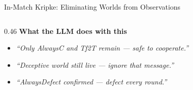 \documentclass[aspectratio=169, 10pt]{beamer}
\begin{document}
\begin{frame}{In-Match Kripke: Eliminating Worlds from Observations}
\begin{columns}[T]
\begin{column}{0.46\textwidth}
            \vspace{0.4cm}
            \textbf{What the LLM does with this}\\[4pt]
            \begin{itemize}
                \item \textit{``Only AlwaysC and Tf2T remain --- safe to cooperate.''}
                \item \textit{``Deceptive world still live --- ignore that message.''}
                \item \textit{``AlwaysDefect confirmed --- defect every round.''}
            \end{itemize}
        \end{column}
    \end{columns}
\end{frame}
\end{document}
